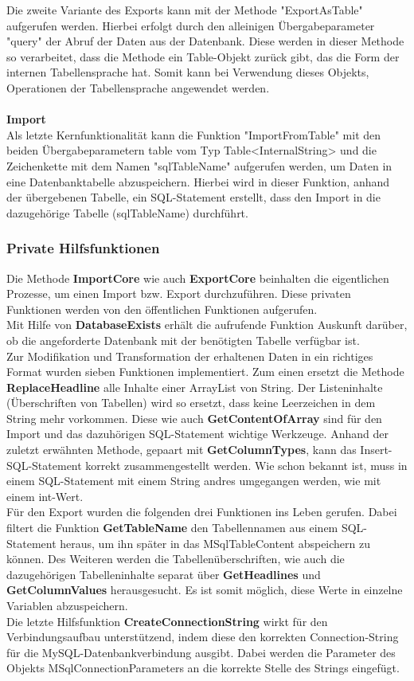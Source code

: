 Die zweite Variante des Exports kann mit der Methode "ExportAsTable" aufgerufen werden. Hierbei erfolgt durch den alleinigen Übergabeparameter "query" der Abruf der Daten aus der Datenbank. Diese werden in dieser Methode so verarbeitet, dass die Methode ein Table-Objekt zurück gibt, das die Form der internen Tabellensprache hat. Somit kann bei Verwendung dieses Objekts, Operationen der Tabellensprache angewendet werden.\\\\
\textbf{Import}\\
Als letzte Kernfunktionalität kann die Funktion "ImportFromTable" mit den beiden Übergabeparametern table vom Typ Table<InternalString> und die Zeichenkette mit dem Namen "sqlTableName" aufgerufen werden, um Daten in eine Datenbanktabelle abzuspeichern. Hierbei wird in dieser Funktion, anhand der übergebenen Tabelle, ein SQL-Statement erstellt, dass den Import in die dazugehörige Tabelle (sqlTableName) durchführt.

\subsubsection{Private Hilfsfunktionen}
\label{mysqlHelper}
Die Methode \textbf{ImportCore} wie auch \textbf{ExportCore} beinhalten die eigentlichen Prozesse, um einen Import bzw. Export durchzuführen. Diese privaten Funktionen werden von den öffentlichen Funktionen aufgerufen.\\
Mit Hilfe von \textbf{DatabaseExists} erhält die aufrufende Funktion Auskunft darüber, ob die angeforderte Datenbank mit der benötigten Tabelle verfügbar ist.\\
Zur Modifikation und Transformation der erhaltenen Daten in ein richtiges Format wurden sieben Funktionen implementiert. Zum einen ersetzt die Methode \textbf{ReplaceHeadline} alle Inhalte einer ArrayList von String. Der Listeninhalte (Überschriften von Tabellen) wird so ersetzt, dass keine Leerzeichen in dem String mehr vorkommen. Diese wie auch \textbf{GetContentOfArray} sind für den Import und das dazuhörigen SQL-Statement wichtige Werkzeuge. Anhand der zuletzt erwähnten Methode, gepaart mit \textbf{GetColumnTypes}, kann das Insert-SQL-Statement korrekt zusammengestellt werden. Wie schon bekannt ist, muss in einem SQL-Statement mit einem String andres umgegangen werden, wie mit einem int-Wert.\\
Für den Export wurden die folgenden drei Funktionen ins Leben gerufen. Dabei filtert die Funktion \textbf{GetTableName} den Tabellennamen aus einem SQL-Statement heraus, um ihn später in das MSqlTableContent abspeichern zu können. Des Weiteren werden die Tabellenüberschriften, wie auch die dazugehörigen Tabelleninhalte separat über \textbf{GetHeadlines} und \textbf{GetColumnValues} herausgesucht. Es ist somit möglich, diese Werte in einzelne Variablen abzuspeichern.\\
Die letzte Hilfsfunktion \textbf{CreateConnectionString} wirkt für den Verbindungsaufbau unterstützend, indem diese den korrekten Connection-String für die MySQL-Datenbankverbindung ausgibt. Dabei werden die Parameter des Objekts MSqlConnectionParameters an die korrekte Stelle des Strings eingefügt.
\newpage

